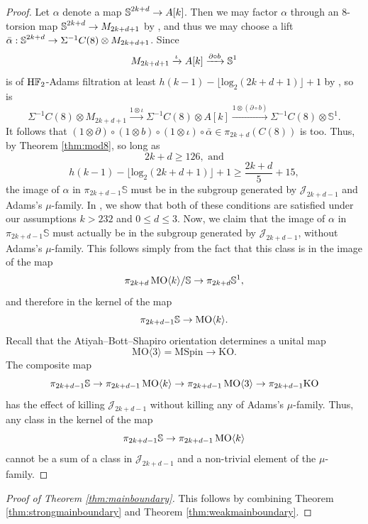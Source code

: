 \begin{proof}
    Let $\alpha$ denote a map $\operatorname{\mathbb{S}}^{2k+d} \to A[k]$. Then we may factor $\alpha$ through an $8$-torsion map $\operatorname{\mathbb{S}}^{2k+d} \to M_{2k+d+1}$ by , and thus we may choose a lift $\bar{\alpha}:\operatorname{\mathbb{S}}^{2k+d} \to \Sigma^{-1}C(8) \otimes M_{2k+d+1}$. Since \[M_{2k+d+1} \xrightarrow{\iota} A[k] \xrightarrow{\partial\circ b} \operatorname{\mathbb{S}}^{1}\] is of $\mathrm{H}\mathbb{F}_2$-Adams filtration at least $h(k-1)-\lfloor \mathrm{log}_2(2k+d+1) \rfloor +1$ by , so is \[\Sigma^{-1}C(8) \otimes M_{2k+d+1} \xrightarrow{1 \otimes \iota} \Sigma^{-1} C(8) \otimes A[k] \xrightarrow{1 \otimes (\partial \circ b)} \Sigma^{-1} C(8) \otimes \mathbb{S}^1.\] It follows that $(1 \otimes \partial) \circ (1 \otimes b) \circ (1 \otimes \iota) \circ \bar{\alpha} \in \pi_{2k+d} \left(C(8)\right)$ is too. Thus, by Theorem \ref{thm:mod8}, so long as
$$2k+d \ge 126, \text{ and}$$
$$h(k-1)-\lfloor \mathrm{log}_2(2k+d+1) \rfloor +1 \ge \frac{2k+d}{5}+15,$$
the image of $\alpha$ in $\pi_{2k+d-1} \mathbb{S}$ must be in the subgroup generated by $\mathcal{J}_{2k+d-1}$ and Adams's $\mu$-family.  In , we show that both of these conditions are satisfied under our assumptions $k > 232$ and $0 \le d \le 3$.
Now, we claim that the image of $\alpha$ in $\pi_{2k+d-1} \mathbb{S}$ must actually be in the subgroup generated by $\mathcal{J}_{2k+d-1}$, without Adams's $\mu$-family.  This follows simply from the fact that this class is in the image of the map
$$\pi_{2k+d} \operatorname{\mathrm{MO}} \langle k \rangle / \mathbb{S} \to \pi_{2k+d} \mathbb{S}^1,$$
and therefore in the kernel of the map
$$\pi_{2k+d-1} \mathbb{S} \to \operatorname{\mathrm{MO}} \langle k \rangle.$$
Recall that the Atiyah--Bott--Shapiro orientation \cite{ABS} determines a unital map 
$$\mathrm{MO} \langle 3 \rangle = \mathrm{MSpin} \to \mathrm{KO}.$$
The composite map
$$\pi_{2k+d-1} \mathbb{S} \to \pi_{2k+d-1} \operatorname{\mathrm{MO}} \langle k \rangle \to \pi_{2k+d-1} \operatorname{\mathrm{MO}} \langle 3 \rangle \to \pi_{2k+d-1} \mathrm{KO}$$
has the effect of killing $\mathcal{J}_{2k+d-1}$ without killing any of Adams's $\mu$-family.  Thus, any class in the kernel of the map
$$\pi_{2k+d-1} \mathbb{S} \to \pi_{2k+d-1} \operatorname{\mathrm{MO}} \langle k \rangle$$
cannot be a sum of a class in $\mathcal{J}_{2k+d-1}$ and a non-trivial element of the $\mu$-family.
\end{proof}

\begin{proof} [Proof of Theorem \ref{thm:mainboundary}]
This follows by combining Theorem \ref{thm:strongmainboundary} and Theorem \ref{thm:weakmainboundary}.
\end{proof}

